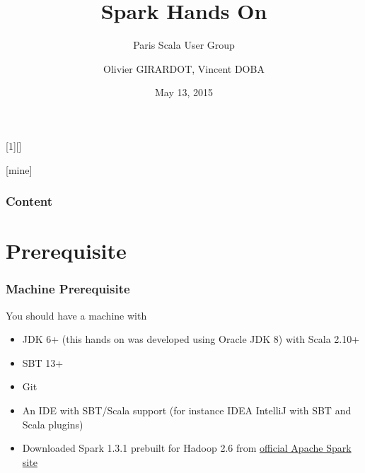 \documentclass[slidetop,9pt,utf8]{beamer}
\begin{document}
\begin{CJK}{UTF8}{gbsn}

\AtBeginSection{\frame{\sectionpage}}

[1][]{%
}

[mine]

\title[Spark Hands On (PSUG)]{Spark Hands On}
\subtitle{Paris Scala User Group}
\author{Olivier GIRARDOT, Vincent DOBA}
\date{May 13, 2015}

\frame{\titlepage}

\begin{frame}
  \frametitle{Content}
  \tableofcontents[hideallsubsections]
\end{frame}

\section{Prerequisite}

\begin{frame}
  \frametitle{Machine Prerequisite}

  \begin{block}{You should have a machine with}
    \begin{itemize}
      \item JDK 6+ (this hands on was developed using Oracle JDK 8) with Scala 2.10+
      \item SBT 13+
      \item Git
      \item An IDE with SBT/Scala support (for instance IDEA IntelliJ with SBT and Scala plugins)
      \item Downloaded Spark 1.3.1 prebuilt for Hadoop 2.6 from \href{http://www.apache.org/dyn/closer.cgi/spark/spark-1.3.1/spark-1.3.1-bin-hadoop2.6.tgz}{official Apache Spark site}
    \end{itemize}
  \end{block}


\end{frame}
\end{CJK}
\end{document}
